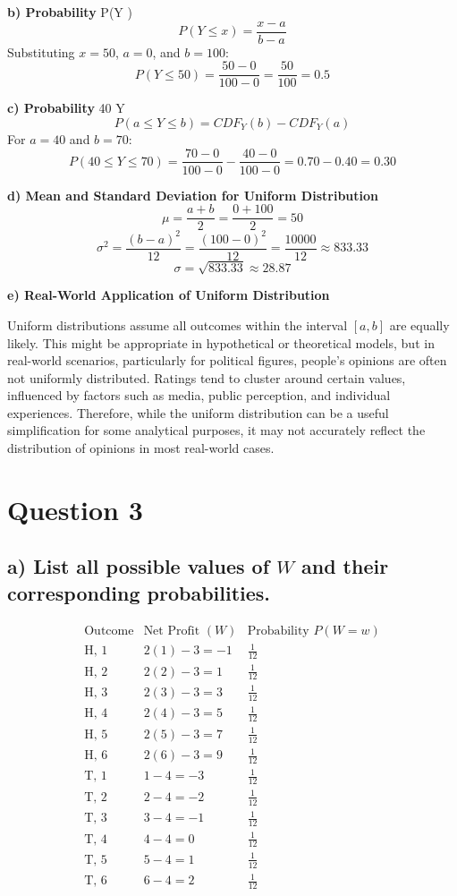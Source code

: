 \documentclass{article}
\begin{document}
\textbf{b) Probability } P(Y )
\[
P(Y \leq x) = \frac{x - a}{b - a}
\]
Substituting \( x = 50 \), \( a = 0 \), and \( b = 100 \):
\[
P(Y \leq 50) = \frac{50 - 0}{100 - 0} = \frac{50}{100} = 0.5
\]

\textbf{c) Probability } 40 \leq Y 
\[
P(a \leq Y \leq b) = CDF_Y(b) - CDF_Y(a)
\]
For \( a = 40 \) and \( b = 70 \):
\[
P(40 \leq Y \leq 70) = \frac{70 - 0}{100 - 0} - \frac{40 - 0}{100 - 0} = 0.70 - 0.40 = 0.30
\]

\textbf{d) Mean and Standard Deviation for Uniform Distribution}
\[
\mu = \frac{a + b}{2} = \frac{0 + 100}{2} = 50
\]
\[
\sigma^2 = \frac{(b - a)^2}{12} = \frac{(100 - 0)^2}{12} = \frac{10000}{12} \approx 833.33
\]
\[
\sigma = \sqrt{833.33} \approx 28.87
\]

\textbf{e) Real-World Application of Uniform Distribution}

Uniform distributions assume all outcomes within the interval \([a, b]\) are equally likely. This might be appropriate in hypothetical or theoretical models, but in real-world scenarios, particularly for political figures, people's opinions are often not uniformly distributed. Ratings tend to cluster around certain values, influenced by factors such as media, public perception, and individual experiences. Therefore, while the uniform distribution can be a useful simplification for some analytical purposes, it may not accurately reflect the distribution of opinions in most real-world cases.

\section*{Question 3}

\subsection*{a) List all possible values of \(W\) and their corresponding probabilities.}

\[
\begin{array}{c|c|c}
\text{Outcome} & \text{Net Profit } (W) & \text{Probability } P(W=w) \\
\hline
\text{H, 1} & 2(1) - 3 = -1 & \frac{1}{12} \\
\text{H, 2} & 2(2) - 3 = 1 & \frac{1}{12} \\
\text{H, 3} & 2(3) - 3 = 3 & \frac{1}{12} \\
\text{H, 4} & 2(4) - 3 = 5 & \frac{1}{12} \\
\text{H, 5} & 2(5) - 3 = 7 & \frac{1}{12} \\
\text{H, 6} & 2(6) - 3 = 9 & \frac{1}{12} \\
\text{T, 1} & 1 - 4 = -3 & \frac{1}{12} \\
\text{T, 2} & 2 - 4 = -2 & \frac{1}{12} \\
\text{T, 3} & 3 - 4 = -1 & \frac{1}{12} \\
\text{T, 4} & 4 - 4 = 0 & \frac{1}{12} \\
\text{T, 5} & 5 - 4 = 1 & \frac{1}{12} \\
\text{T, 6} & 6 - 4 = 2 & \frac{1}{12} \\
\end{array}
\]
\end{document}
